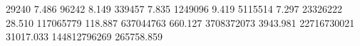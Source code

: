 29240        7.486
96242        8.149
339457       7.835
1249096      9.419
5115514      7.297
23326222     28.510
117065779    118.887
637044763    660.127
3708372073   3943.981
22716730021  31017.033
144812796269 265758.859
